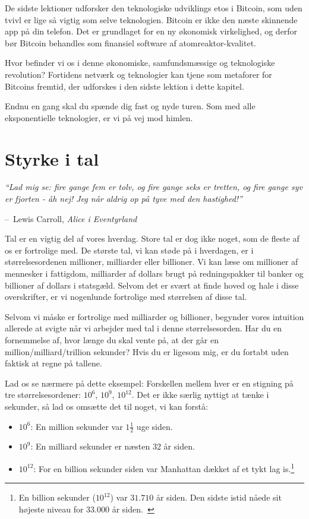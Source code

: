 \documentclass[paper=6in:9in,pagesize=pdftex,
               headinclude=on,footinclude=on,12pt]{scrbook}
\makeatletter
\newenvironment{chapquote}[2][4em]{\setlength{\@tempdima}{#1}%
   \def\chapquote@author{#2}%
   \parshape 1 \@tempdima \dimexpr\textwidth-2\@tempdima\relax%
   \itshape}{\par\normalfont\hfill--\ \chapquote@author\hspace*{\@tempdima}\par\bigskip}
\makeatother
\begin{document}
De sidste lektioner udforsker den teknologiske udviklings etos i Bitcoin, som uden tvivl er lige så vigtig som selve teknologien. Bitcoin er ikke den næste skinnende app på din telefon. Det er grundlaget for en ny økonomisk virkelighed, og derfor bør Bitcoin behandles som finansiel software af atomreaktor-kvalitet.

Hvor befinder vi os i denne økonomiske, samfundsmæssige og teknologiske revolution? Fortidens netværk og teknologier kan tjene som metaforer for Bitcoins fremtid, der udforskes i den sidste lektion i dette kapitel.

Endnu en gang skal du spænde dig fast og nyde turen. Som med alle eksponentielle teknologier, er vi på vej mod himlen. 
\chapter{Styrke i tal}
\label{les:15}

\begin{chapquote}{Lewis Carroll, \textit{Alice i Eventyrland}} \enquote{Lad mig se: fire gange fem er tolv, og fire gange seks er tretten, og fire gange syv er fjorten - åh nej! Jeg når aldrig op på tyve med den hastighed!} \end{chapquote}

Tal er en vigtig del af vores hverdag. Store tal er dog ikke noget, som de fleste af os er fortrolige med. De største tal, vi kan støde på i hverdagen, er i størrelsesordenen millioner, milliarder eller billioner. Vi kan læse om millioner af mennesker i fattigdom, milliarder af dollars brugt på redningspakker til banker og billioner af dollars i statsgæld. Selvom det er svært at finde hoved og hale i disse overskrifter, er vi nogenlunde fortrolige med størrelsen af disse tal.

Selvom vi måske er fortrolige med milliarder og billioner, begynder vores intuition allerede at svigte når vi arbejder med tal i denne størrelsesorden. Har du en fornemmelse af, hvor længe du skal vente på, at der går en million/milliard/trillion sekunder? Hvis du er ligesom mig, er du fortabt uden faktisk at regne på tallene.

Lad os se nærmere på dette eksempel: Forskellen mellem hver er en stigning på tre størrelsesordener: $10^6$, $10^9$, $10^{12}$. Det er ikke særlig nyttigt at tænke i sekunder, så lad os omsætte det til noget, vi kan forstå:\begin{itemize}
  \item $10^6$: En million sekunder var $1 \frac{1}{2}$ uge siden. \item $10^9$: En milliard sekunder er næsten 32 år siden. \item $10^{12}$: For en billion sekunder siden var Manhattan dækket af et tykt lag is.\footnote{En billion sekunder ($10^{12}$) var $31.710$ år siden. Den sidste istid nåede sit højeste niveau for $33.000$ år siden.~\cite{wiki:LGM}}
\end{itemize}
\end{document}
